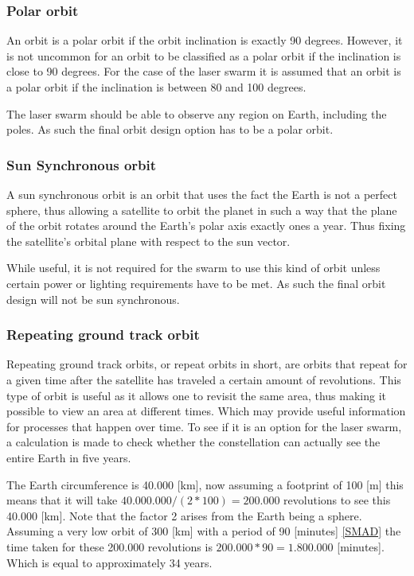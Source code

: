 \documentclass{article}
\begin{document}
\subsubsection{Polar orbit}

An orbit is a polar orbit if the orbit inclination is exactly 90 degrees. However, it is not uncommon for an orbit to be classified as a polar orbit if the inclination is close to 90 degrees. For the case of the laser swarm it is assumed that an orbit is a polar orbit if the inclination is between 80 and 100 degrees.

The laser swarm should be able to observe any region on Earth, including the poles. As such the final orbit design option has to be a polar orbit.

\subsubsection{Sun Synchronous orbit}
A sun synchronous orbit is an orbit that uses the fact the Earth is not a perfect sphere, thus allowing a satellite to orbit the planet in such a way that the plane of the orbit rotates around the Earth's polar axis exactly ones a year. Thus fixing the satellite's orbital plane with respect to the sun vector.

While useful, it is not required for the swarm to use this kind of orbit unless certain power or lighting requirements have to be met. As such the final orbit design will not be sun synchronous.

\subsubsection{Repeating ground track orbit}
Repeating ground track orbits, or repeat orbits in short, are orbits that repeat for a given time after the satellite has traveled a certain amount of revolutions. This type of orbit is useful as it allows one to revisit the same area, thus making it possible to view an area at different times. Which may provide useful information for processes that happen over time.
To see if it is an option for the laser swarm, a calculation is made to check whether the constellation can actually see the entire Earth in five years.

The Earth circumference is 40.000 [km], now assuming a footprint of 100 [m] this means that it will take $40.000.000/(2*100)=200.000$ revolutions to see this 40.000 [km]. Note that the factor 2 arises from the Earth being a sphere. Assuming a very low orbit of 300 [km] with a period of 90 [minutes] \ref{SMAD} the time taken for these 200.000 revolutions is $200.000*90=1.800.000$ [minutes]. Which is equal to approximately 34 years.
\end{document}

